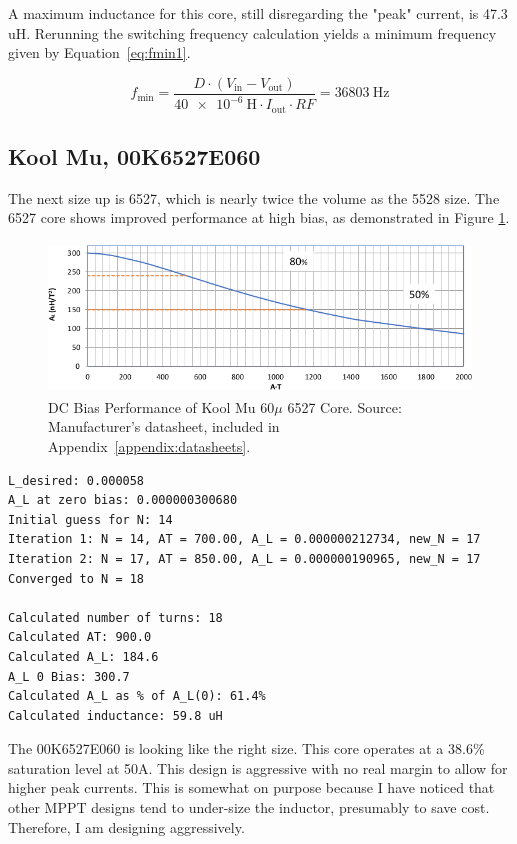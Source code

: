 \documentclass{article}
\begin{document}
A maximum inductance for this core, still disregarding the "peak" current, is 47.3 uH.  Rerunning the switching frequency calculation yields a minimum frequency given by Equation~\eqref{eq:fmin1}.

\begin{equation}
\label{eq:fmin1}
    f_{\text{min}} = \frac{D \cdot (V_{\text{in}} - V_{\text{out}})}{\SI{40e-6}{\henry} \cdot I_{\text{out}} \cdot RF} = \SI{36803}{\hertz}
\end{equation}

\subsection{Kool Mu, 00K6527E060}
The next size up is 6527, which is nearly twice the volume as the 5528 size.
The 6527 core shows improved performance at high bias, as demonstrated in Figure \ref{fig:dcbias_6527}. \\

\begin{figure}[H]
    \centering
    \includegraphics[height=4cm]{00K6527E060_dcbias_notitle.png}
    \caption{DC Bias Performance of Kool Mu $60\mu$ 6527 Core.  Source: Manufacturer's datasheet, included in Appendix~\ref{appendix:datasheets}.}
    \label{fig:dcbias_6527}
\end{figure}

\begin{verbatim}
L_desired: 0.000058
A_L at zero bias: 0.000000300680
Initial guess for N: 14
Iteration 1: N = 14, AT = 700.00, A_L = 0.000000212734, new_N = 17
Iteration 2: N = 17, AT = 850.00, A_L = 0.000000190965, new_N = 17
Converged to N = 18

Calculated number of turns: 18
Calculated AT: 900.0
Calculated A_L: 184.6
A_L 0 Bias: 300.7
Calculated A_L as % of A_L(0): 61.4%
Calculated inductance: 59.8 uH    
\end{verbatim}

The 00K6527E060 is looking like the right size.  This core operates at a 38.6\% saturation level at 50A.  This design is aggressive with no real margin to allow for higher peak currents.  This is somewhat on purpose because I have noticed that other MPPT designs tend to under-size the inductor, presumably to save cost.  Therefore, I am designing aggressively.
\end{document}
